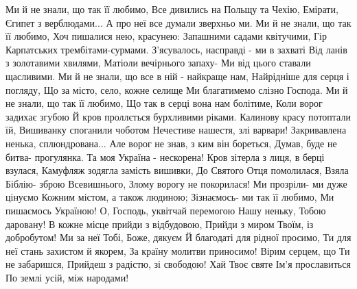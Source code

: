 \raggedcolumns
\begin{multicols}{3} %
\setlength{\parindent}{0pt}

\obeycr
Ми й не знали, що так її любимо,
Все дивились на Польщу та Чехію,
Емірати, Єгипет з верблюдами...
А про неї все думали зверхньо ми.
\smallskip
Ми й не знали, що так її любимо,
Хоч пишалися нею, красунею:
Запашними садами квітучими,
Гір Карпатських трембітами-сурмами.
\smallskip
З'ясувалось, насправді - ми в захваті
Від ланів з золотавими хвилями,
Матіоли вечірнього запаху-
Ми від цього ставали щасливими.
\smallskip
Ми й не знали, що все в ній - найкраще нам,
Найрідніше для серця і погляду,
Що за місто, село, кожне селище
Ми благатимемо слізно Господа.
\smallskip
Ми й не знали, що так її любимо,
Що так в серці вона нам болітиме,
Коли ворог задихає згубою
Й кров проллється бурхливими ріками.
\smallskip
Калинову красу потоптали їй,
Вишиванку споганили чоботом
Нечестиве нашестя, злі варвари!
Закривавлена ненька, сплюндрована...
\smallskip
Але ворог не знав, з ким він бореться,
Думав, буде не битва- прогулянка.
Та моя Україна - нескорена!
\smallskip
Кров зітерла з лиця, в берці взулася,
Камуфляж зодягла замість вишивки,
До Святого Отця помолилася,
Взяла Біблію- зброю Всевишнього,
Злому ворогу не покорилася!
\smallskip
Ми прозріли- ми дуже цінуємо
Кожним містом, а також людиною;
Зізнаємось- ми так її любимо,
Ми пишаємось Україною!
\smallskip
О, Господь, уквітчай перемогою
Нашу неньку, Тобою даровану!
В кожне місце прийди з відбудовою,
Прийди з миром Твоїм, із добробутом!
\smallskip
Ми за неї Тобі, Боже, дякуєм
Й благодаті для рідної просимо,
Ти для неї стань захистом й якорем,
За країну молитви приносимо!
\smallskip
Вірим серцем, що Ти не забаришся,
Прийдеш з радістю, зі свободою!
Хай Твоє святе Ім'я прославиться
По землі усій, між народами!
\restorecr

\end{multicols} %

